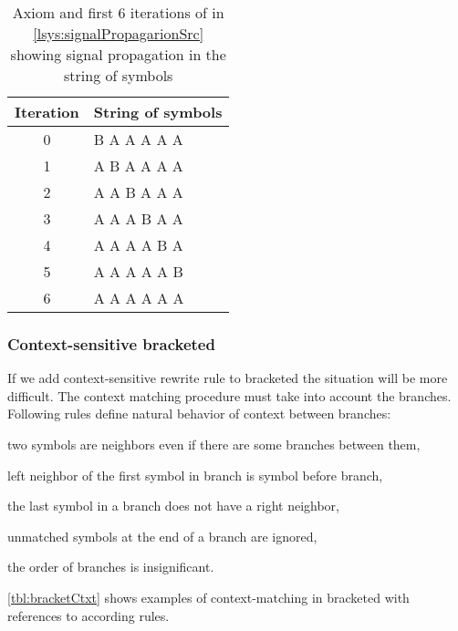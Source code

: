 \begin{table}[h]
	\centering
	\begin{tabular}{c l}
   		\toprule
   		Iteration & String of symbols \\
   		\midrule
		0 & B A A A A A \\
		1 & A B A A A A \\
		2 & A A B A A A \\
		3 & A A A B A A \\
		4 & A A A A B A \\
		5 & A A A A A B \\
		6 & A A A A A A \\
		\bottomrule
	\end{tabular}
	\caption{Axiom and first 6 iterations of \lsystem in \autoref{lsys:signalPropagarionSrc} showing signal propagation in the string of symbols}
	\label{fig:signalPropagarion}
\end{table}


\subsubsection{Context-sensitive bracketed \lsystems}
\label{sec:bracketedLsystems}

If we add context-sensitive rewrite rule to bracketed \lsystems the situation will be more difficult.
The context matching procedure must take into account the branches.
Following rules define natural behavior of context between branches:
\begin{enumerate*}
	\item \label{enum:ctxRule1} two symbols are neighbors even if there are some branches between them,
	\item \label{enum:ctxRule2} left neighbor of the first symbol in branch is symbol before branch,
	\item \label{enum:ctxRule3} the last symbol in a branch does not have a right neighbor,
	\item \label{enum:ctxRule4} unmatched symbols at the end of a branch are ignored,
	\item \label{enum:ctxRule5} the order of branches is insignificant.
\end{enumerate*}

\autoref{tbl:bracketCtxt} shows examples of context-matching in bracketed \lsystems with references to according rules.

